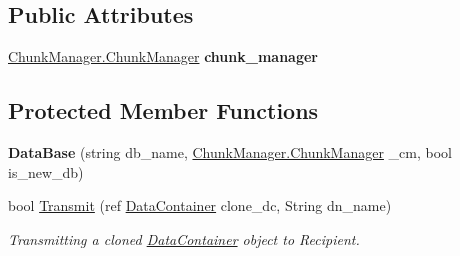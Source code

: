 \subsection*{Public Attributes}
\begin{DoxyCompactItemize}
\item 
\hypertarget{class_dwarf_d_b_1_1_data_structures_1_1_data_base_a8ccf11a71c383f6f1ac6870022a261c3}{
\hyperlink{class_dwarf_d_b_1_1_chunk_manager_1_1_chunk_manager}{ChunkManager.ChunkManager} {\bfseries chunk\_\-manager}}
\label{class_dwarf_d_b_1_1_data_structures_1_1_data_base_a8ccf11a71c383f6f1ac6870022a261c3}

\end{DoxyCompactItemize}
\subsection*{Protected Member Functions}
\begin{DoxyCompactItemize}
\item 
\hypertarget{class_dwarf_d_b_1_1_data_structures_1_1_data_base_ab2fe1cc1e8d59bbc68ad1f996507c4ee}{
{\bfseries DataBase} (string db\_\-name, \hyperlink{class_dwarf_d_b_1_1_chunk_manager_1_1_chunk_manager}{ChunkManager.ChunkManager} \_\-cm, bool is\_\-new\_\-db)}
\label{class_dwarf_d_b_1_1_data_structures_1_1_data_base_ab2fe1cc1e8d59bbc68ad1f996507c4ee}

\item 
bool \hyperlink{class_dwarf_d_b_1_1_data_structures_1_1_data_base_a5eefaebdb94adf4d3b19f29e8f146725}{Transmit} (ref \hyperlink{class_dwarf_d_b_1_1_data_structures_1_1_data_container}{DataContainer} clone\_\-dc, String dn\_\-name)
\begin{DoxyCompactList}\small\item\em Transmitting a cloned \hyperlink{class_dwarf_d_b_1_1_data_structures_1_1_data_container}{DataContainer} object to Recipient. \item\end{DoxyCompactList}\end{DoxyCompactItemize}
